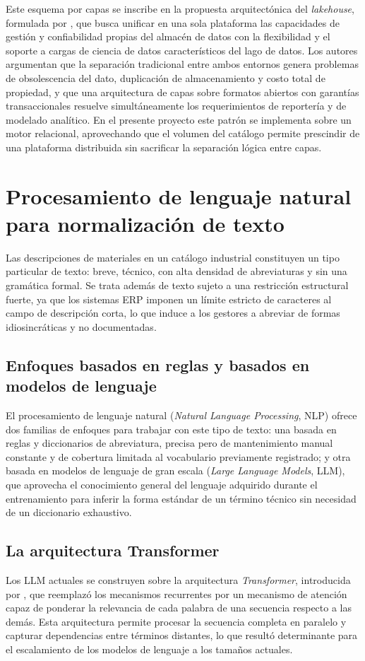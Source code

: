 Este esquema por capas se inscribe en la propuesta arquitectónica del \textit{lakehouse}, formulada por , que busca unificar en una sola plataforma las capacidades de gestión y confiabilidad propias del almacén de datos con la flexibilidad y el soporte a cargas de ciencia de datos característicos del lago de datos. Los autores argumentan que la separación tradicional entre ambos entornos genera problemas de obsolescencia del dato, duplicación de almacenamiento y costo total de propiedad, y que una arquitectura de capas sobre formatos abiertos con garantías transaccionales resuelve simultáneamente los requerimientos de reportería y de modelado analítico. En el presente proyecto este patrón se implementa sobre un motor relacional, aprovechando que el volumen del catálogo permite prescindir de una plataforma distribuida sin sacrificar la separación lógica entre capas.

\section{Procesamiento de lenguaje natural para normalización de texto}
Las descripciones de materiales en un catálogo industrial constituyen un tipo particular de texto: breve, técnico, con alta densidad de abreviaturas y sin una gramática formal. Se trata además de texto sujeto a una restricción estructural fuerte, ya que los sistemas ERP imponen un límite estricto de caracteres al campo de descripción corta, lo que induce a los gestores a abreviar de formas idiosincráticas y no documentadas.

\subsection{Enfoques basados en reglas y basados en modelos de lenguaje}
El procesamiento de lenguaje natural (\textit{Natural Language Processing}, NLP) ofrece dos familias de enfoques para trabajar con este tipo de texto: una basada en reglas y diccionarios de abreviatura, precisa pero de mantenimiento manual constante y de cobertura limitada al vocabulario previamente registrado; y otra basada en modelos de lenguaje de gran escala (\textit{Large Language Models}, LLM), que aprovecha el conocimiento general del lenguaje adquirido durante el entrenamiento para inferir la forma estándar de un término técnico sin necesidad de un diccionario exhaustivo.

\subsection{La arquitectura Transformer}
Los LLM actuales se construyen sobre la arquitectura \textit{Transformer}, introducida por , que reemplazó los mecanismos recurrentes por un mecanismo de atención capaz de ponderar la relevancia de cada palabra de una secuencia respecto a las demás. Esta arquitectura permite procesar la secuencia completa en paralelo y capturar dependencias entre términos distantes, lo que resultó determinante para el escalamiento de los modelos de lenguaje a los tamaños actuales.

